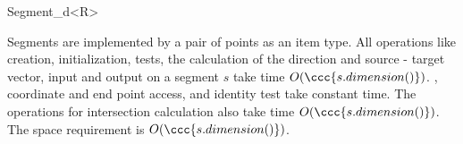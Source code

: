 \begin{ccRefClass}{Segment_d<R>}
\ccImplementation


Segments are implemented by a pair of points as an item type.  All
operations like creation, initialization, tests, the calculation of
the direction and source - target vector, input and output on a
segment $s$ take time $O(\ccc{s.dimension()})$. , coordinate
and end point access, and identity test take constant time.  The
operations for intersection calculation also take time
$O(\ccc{s.dimension()})$. The space requirement is $O(\ccc{s.dimension()})$.
 



\end{ccRefClass}


